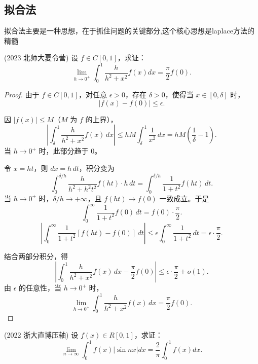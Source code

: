 \documentclass[lang=cn,10pt,thmcnt=section]{elegantbook}
\begin{document}
\subsection{拟合法}
拟合法主要是一种思想，在于抓住问题的关键部分,这个核心思想是laplace方法的精髓
\begin{example}
	(2023 北师大夏令营) 设 $f \in C[0,1]$，求证：
\[
\lim_{h \to 0^+} \int_0^1 \frac{h}{h^2 + x^2} f(x) dx = \frac{\pi}{2} f(0).
\]

\end{example}
\begin{proof}
	由于 \( f \in C[0,1] \)，对任意 \( \epsilon > 0 \)，存在 \( \delta > 0 \)，使得当 \( x \in [0, \delta] \) 时，
\[
|f(x) - f(0)| \leq \epsilon.
\]

因 \( |f(x)| \leq M \)（\( M \) 为 \( f \) 的上界），
\[
\left| \int_\delta^1 \frac{h}{h^2 + x^2} f(x) \, dx \right| \leq hM \int_\delta^1 \frac{1}{x^2} \, dx = hM \left( \frac{1}{\delta} - 1 \right).
\]
当 \( h \to 0^+ \) 时，此部分趋于 \( 0 \)。

令 \( x = ht \)，则 \( dx = h \, dt \)，积分变为
\[
\int_0^{\delta/h} \frac{h}{h^2 + h^2 t^2} f(ht) \cdot h \, dt = \int_0^{\delta/h} \frac{1}{1 + t^2} f(ht) \, dt.
\]
当 \( h \to 0^+ \) 时，\( \delta/h \to +\infty \)，且 \( f(ht) \to f(0) \) 一致成立。于是
\[
\int_0^{\infty} \frac{1}{1 + t^2} f(0) \, dt = f(0) \cdot \frac{\pi}{2}.
\]
\[
\left| \int_0^{\infty} \frac{1}{1 + t^2} [f(ht) - f(0)] \, dt \right| \leq \epsilon \int_0^{\infty} \frac{1}{1 + t^2} \, dt = \epsilon \cdot \frac{\pi}{2}.
\]

结合两部分积分，得
\[
\left| \int_0^1 \frac{h}{h^2 + x^2} f(x) \, dx - \frac{\pi}{2} f(0) \right| \leq \epsilon \cdot \frac{\pi}{2} + o(1).
\]
由 \( \epsilon \) 的任意性，当 \( h \to 0^+ \) 时，
\[
\lim_{h \to 0^+} \int_0^1 \frac{h}{h^2 + x^2} f(x) \, dx = \frac{\pi}{2} f(0).
\]
\end{proof}
\begin{example}
	(2022 浙大直博压轴) 设 $f(x) \in R[0,1]$，求证：
\[
\lim_{n \to \infty} \int_0^1 f(x) |\sin nx| dx = \frac{2}{\pi} \int_0^1 f(x) dx.
\]

\end{example}
\end{document}
